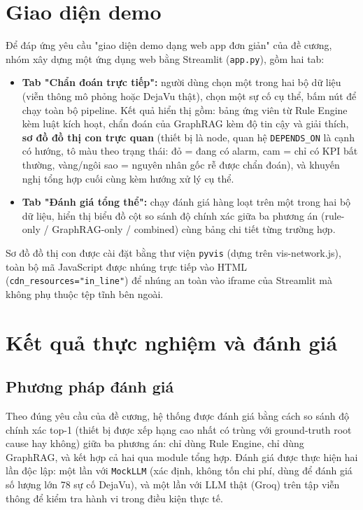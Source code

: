 \documentclass[12pt,a4paper]{report}
\newcommand{\code}[1]{\texttt{\small #1}}
\begin{document}
\chapter{Giao diện demo}
\label{ch:demo}

Để đáp ứng yêu cầu "giao diện demo dạng web app đơn giản" của đề cương, nhóm xây dựng một ứng dụng
web bằng Streamlit (\code{app.py}), gồm hai tab:

\begin{itemize}
    \item \textbf{Tab "Chẩn đoán trực tiếp":} người dùng chọn một trong hai bộ dữ liệu (viễn thông
    mô phỏng hoặc DejaVu thật), chọn một sự cố cụ thể, bấm nút để chạy toàn bộ pipeline. Kết quả
    hiển thị gồm: bảng ứng viên từ Rule Engine kèm luật kích hoạt, chẩn đoán của GraphRAG kèm độ
    tin cậy và giải thích, \textbf{sơ đồ đồ thị con trực quan} (thiết bị là node, quan hệ
    \code{DEPENDS\_ON} là cạnh có hướng, tô màu theo trạng thái: đỏ = đang có alarm, cam = chỉ có
    KPI bất thường, vàng/ngôi sao = nguyên nhân gốc rễ được chẩn đoán), và khuyến nghị tổng hợp
    cuối cùng kèm hướng xử lý cụ thể.
    \item \textbf{Tab "Đánh giá tổng thể":} chạy đánh giá hàng loạt trên một trong hai bộ dữ liệu,
    hiển thị biểu đồ cột so sánh độ chính xác giữa ba phương án (rule-only / GraphRAG-only /
    combined) cùng bảng chi tiết từng trường hợp.
\end{itemize}

Sơ đồ đồ thị con được cài đặt bằng thư viện \code{pyvis} (dựng trên vis-network.js), toàn bộ mã
JavaScript được nhúng trực tiếp vào HTML (\code{cdn\_resources="in\_line"}) để nhúng an toàn vào
iframe của Streamlit mà không phụ thuộc tệp tĩnh bên ngoài.

\chapter{Kết quả thực nghiệm và đánh giá}
\label{ch:ket-qua}

\section{Phương pháp đánh giá}

Theo đúng yêu cầu của đề cương, hệ thống được đánh giá bằng cách so sánh độ chính xác top-1 (thiết
bị được xếp hạng cao nhất có trùng với ground-truth root cause hay không) giữa ba phương án: chỉ
dùng Rule Engine, chỉ dùng GraphRAG, và kết hợp cả hai qua module tổng hợp. Đánh giá được thực hiện
hai lần độc lập: một lần với \code{MockLLM} (xác định, không tốn chi phí, dùng để đánh giá số lượng
lớn 78 sự cố DejaVu), và một lần với LLM thật (Groq) trên tập viễn thông để kiểm tra hành vi trong
điều kiện thực tế.
\end{document}
